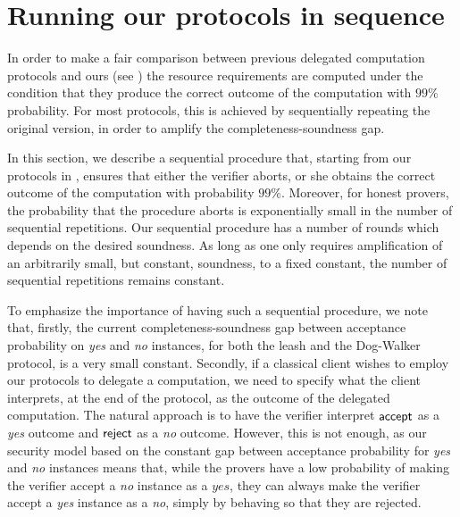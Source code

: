 \documentclass{toc}
\begin{document}
 

\section{Running our protocols in sequence}
\label{sec:sequential}

In order to make a fair comparison between previous delegated computation protocols and ours (see ) the resource requirements are computed under the condition that they produce the correct outcome of the computation with $99\%$ probability. For most protocols, this is achieved by sequentially repeating the original version, in order to amplify the completeness-soundness gap. 

In this section, we describe a sequential procedure that, starting from our protocols in  , ensures that either the verifier aborts, or she obtains the correct outcome of the computation with probability $99\%$. Moreover, for honest provers, the probability that the procedure aborts is exponentially small in the number of sequential repetitions. Our sequential procedure has a number of rounds which depends on the desired soundness. As long as one only requires amplification of an arbitrarily small, but constant, soundness, to a fixed constant, the number of sequential repetitions remains constant.

To emphasize the importance of having such a sequential procedure, we note that, firstly, the current completeness-soundness gap between acceptance probability on \textit{yes} and \textit{no} instances, for both the leash and the Dog-Walker protocol, is a very small constant. Secondly, if a classical client wishes to employ our protocols to delegate a computation, we need to specify what the client interprets, at the end of the protocol, as the outcome of the delegated computation. The natural approach is to have the verifier interpret $\sf accept$ as a \textit{yes} outcome and $\sf reject$ as a \textit{no} outcome. However, this is not enough, as our security model based on the constant gap between acceptance probability for \textit{yes} and \textit{no} instances means that, while the provers have a low probability of making the verifier accept a \textit{no} instance as a $\textit{yes}$, they can always make the verifier accept a \textit{yes} instance as a \textit{no}, simply by behaving so that they are rejected.
\end{document}
